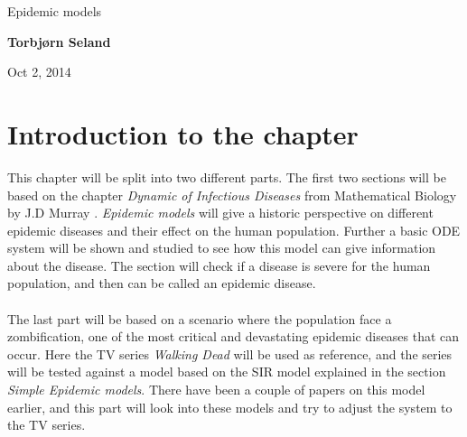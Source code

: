 \documentclass[%
twoside,                 %
final,                   %
10pt]{article}
\begin{document}




\thispagestyle{empty}

\begin{center}
{\LARGE\bf
\begin{spacing}{1.25}
Epidemic models
\end{spacing}
}
\end{center}


\begin{center}
{\bf Torbjørn Seland${}^{}$} \\ [0mm]
\end{center}

    \begin{center}
\end{center}


\begin{center}
Oct 2, 2014
\end{center}

\vspace{1cm}


\tableofcontents


\vspace{1cm} %



\newcommand{\Imax}{I_{\textrm{max}}}
\section{Introduction to the chapter}
This chapter will be split into two different parts. The first two sections will be based on the chapter \emph{Dynamic of Infectious Diseases} from Mathematical Biology by J.D Murray \cite{murray2002mathematical}. \emph{Epidemic models} will give a historic perspective on different epidemic diseases and their effect on the human population. Further a basic ODE system will be shown and studied to see how this model can give information about the disease. The section will check if a disease is severe for the human population, and then can be called an epidemic disease.
\\
\\
The last part will be based on a scenario where the population face a zombification, one of the most critical and devastating epidemic diseases that can occur. Here the TV series \emph{Walking Dead} will be used as reference, and the series will be tested against a model based on the SIR model explained in the section \emph{Simple Epidemic models}. There have been a couple of papers on this model earlier, and this part will look into these models and try to adjust the system to the TV series.     
\end{document}
